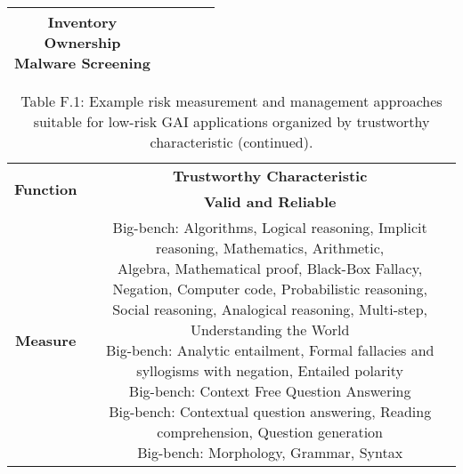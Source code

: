 \documentclass[fleqn]{article}
\begin{document}
\begin{landscape}
\begin{table}[H]
\begin{tabular}{|c|c|c|c|c|}
{			\textbullet\hspace{3pt} Inventory\\ 	
			\textbullet\hspace{3pt} Ownership\\  	
			\textbullet\hspace{3pt} Malware Screening\\ 
		}
		\\
		\hline
	\end{tabular}
	\label{table:low_risk_plan_by_tc_cont}
\end{table}

\end{landscape}

\pagebreak 

\begin{table}[H]
	\caption*{Table F.1: Example risk measurement and management approaches suitable for low-risk GAI applications organized by trustworthy characteristic (continued).}
	\footnotesize
	\begin{tabular}{|c|c|}
		\hline
		\multirow{2}{*}{\textbf{Function}} & \multicolumn{1}{|c|}{\textbf{Trustworthy Characteristic}}   \\
		\cline{2-2}
		& \textbf{Valid and Reliable} \\
		\hline
		\textbf{Measure} 
		& 
		\makecell[l]{ 
			\textbullet\hspace{3pt} Big-bench: Algorithms, Logical reasoning, Implicit reasoning, Mathematics, Arithmetic, \\\hspace{10pt}Algebra, Mathematical proof, Black-Box Fallacy, Negation, Computer code, Probabilistic reasoning, \\\hspace{10pt}Social reasoning, Analogical reasoning, Multi-step, Understanding the World \\ 
			\textbullet\hspace{3pt} Big-bench: Analytic entailment, Formal fallacies and syllogisms with negation, Entailed polarity \\ 
			\textbullet\hspace{3pt} Big-bench: Context Free Question Answering \\ 
			\textbullet\hspace{3pt} Big-bench: Contextual question answering, Reading comprehension, Question generation \\ 
			\textbullet\hspace{3pt} Big-bench: Morphology, Grammar, Syntax \\ 
}
\end{tabular}
\end{table}
\end{document}
